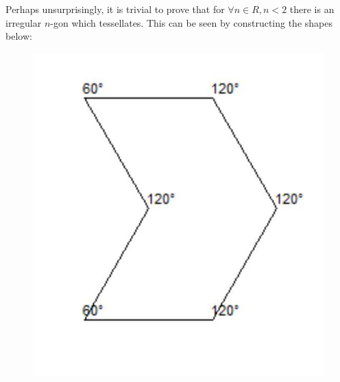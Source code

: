 Perhaps unsurprisingly, it is trivial to prove that for \(∀ n∈R, n<2\)
there is an irregular \(n\)-gon which tessellates. This can be seen by
constructing the shapes below:

\begin{figure}[htbp]
\centering
\includegraphics{image_3.jpg}
\caption{}
\end{figure}

